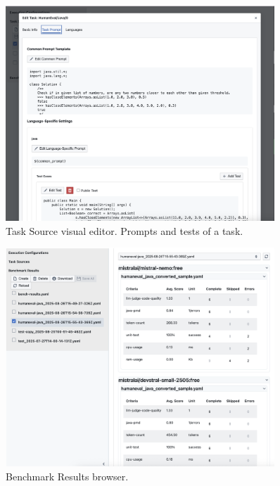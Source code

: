 \begin{figure}[H]
    \includegraphics[width=0.9\textwidth]{./images/ui_task_source_prompts}
    \caption{Task Source visual editor. Prompts and tests of a task.}
    \label{appendix:ui_task_source_prompts}
\end{figure}

\begin{figure}[H]
    \includegraphics[width=0.9\textwidth]{./images/ui_results_multiple}
    \caption{Benchmark Results browser. }
    \label{appendix:ui_results_multiple}
\end{figure}

